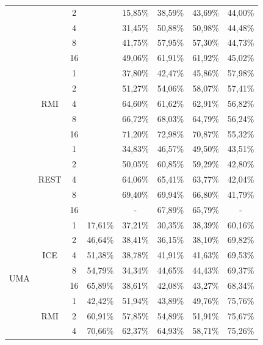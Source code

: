 \begin{table}[]
{\begin{tabular}{|c|c|c|c|c|c|c|c|}
			&  & 2 &  & 15,85\% & 38,59\% & 43,69\% & 44,00\% \\ \cline{3-3} \cline{5-8} 
			&  & 4 &  & 31,45\% & 50,88\% & 50,98\% & 44,48\% \\ \cline{3-3} \cline{5-8} 
			&  & 8 &  & 41,75\% & 57,95\% & 57,30\% & 44,73\% \\ \cline{3-3} \cline{5-8} 
			&  & 16 &  & 49,06\% & 61,91\% & 61,92\% & 45,02\% \\ \cline{2-3} \cline{5-8} 
			& \multirow{5}{*}{RMI} & 1 &  & 37,80\% & 42,47\% & 45,86\% & 57,98\% \\ \cline{3-3} \cline{5-8} 
			&  & 2 &  & 51,27\% & 54,06\% & 58,07\% & 57,41\% \\ \cline{3-3} \cline{5-8} 
			&  & 4 &  & 64,60\% & 61,62\% & 62,91\% & 56,82\% \\ \cline{3-3} \cline{5-8} 
			&  & 8 &  & 66,72\% & 68,03\% & 64,79\% & 56,24\% \\ \cline{3-3} \cline{5-8} 
			&  & 16 &  & 71,20\% & 72,98\% & 70,87\% & 55,32\% \\ \cline{2-3} \cline{5-8} 
			& \multirow{5}{*}{REST} & 1 &  & 34,83\% & 46,57\% & 49,50\% & 43,51\% \\ \cline{3-3} \cline{5-8} 
			&  & 2 &  & 50,05\% & 60,85\% & 59,29\% & 42,80\% \\ \cline{3-3} \cline{5-8} 
			&  & 4 &  & 64,06\% & 65,41\% & 63,77\% & 42,04\% \\ \cline{3-3} \cline{5-8} 
			&  & 8 &  & 69,40\% & 69,94\% & 66,80\% & 41,79\% \\ \cline{3-3} \cline{5-8} 
			&  & 16 &  & - & 67,89\% & 65,79\% & - \\ \hline
			\multirow{14}{*}{UMA} & \multirow{5}{*}{ICE} & 1 & 17,61\% & 37,21\% & 30,35\% & 38,39\% & 60,16\% \\ \cline{3-8} 
			&  & 2 & 46,64\% & 38,41\% & 36,15\% & 38,10\% & 69,82\% \\ \cline{3-8} 
			&  & 4 & 51,38\% & 38,78\% & 41,91\% & 41,63\% & 69,53\% \\ \cline{3-8} 
			&  & 8 & 54,79\% & 34,34\% & 44,65\% & 44,43\% & 69,37\% \\ \cline{3-8} 
			&  & 16 & 65,89\% & 38,61\% & 42,08\% & 43,27\% & 68,34\% \\ \cline{2-8} 
			& \multirow{5}{*}{RMI} & 1 & 42,42\% & 51,94\% & 43,89\% & 49,76\% & 75,76\% \\ \cline{3-8} 
			&  & 2 & 60,91\% & 57,85\% & 54,89\% & 51,91\% & 75,67\% \\ \cline{3-8} 
			&  & 4 & 70,66\% & 62,37\% & 64,93\% & 58,71\% & 75,26\% \\ \cline{3-8} 

\end{tabular}}
\end{table}
